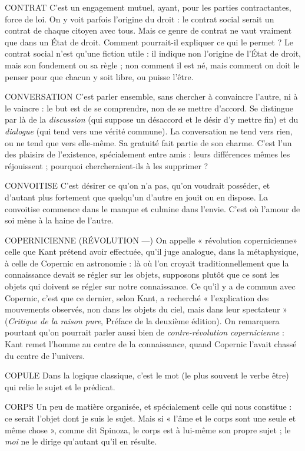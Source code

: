 CONTRAT C'est un engagement mutuel, ayant, pour les parties contractantes,
force de loi. On y voit parfois l’origine du droit : le
contrat social serait un contrat de chaque citoyen avec tous. Mais ce genre de
contrat ne vaut vraiment que dans un État de droit. Comment pourrait-il
expliquer ce qui le permet ?
Le contrat social n’est qu’une fiction utile : il indique non l’origine de
l’État de droit, mais son fondement ou sa règle ; non comment il est né, mais
comment on doit le penser pour que chacun y soit libre, ou puisse l'être.

CONVERSATION C’est parler ensemble, sans chercher à convaincre l’autre,
ni à le vaincre : le but est de se comprendre, non de se
mettre d’accord. Se distingue par là de la {\it discussion} (qui suppose un désaccord et le
désir d’y mettre fin) et du {\it dialogue} (qui tend vers une vérité commune). La conversation
ne tend vers rien, ou ne tend que vers elle-même. Sa gratuité fait partie de
son charme. C’est l’un des plaisirs de l'existence, spécialement entre amis : leurs différences
mêmes les réjouissent ; pourquoi chercheraient-ils à les supprimer ?

CONVOITISE C’est désirer ce qu’on n’a pas, qu’on voudrait posséder, et
d’autant plus fortement que quelqu'un d’autre en jouit ou
en dispose. La convoitise commence dans le manque et culmine dans l'envie.
C’est où l’amour de soi mène à la haine de l’autre.

COPERNICIENNE (RÉVOLUTION —) On appelle « révolution copernicienne» celle que Kant prétend
avoir effectuée, qu’il juge analogue, dans la métaphysique, à celle de Copernic
en astronomie : là où l’on croyait traditionnellement que la connaissance devait
se régler sur les objets, supposons plutôt que ce sont les objets qui doivent se
régler sur notre connaissance. Ce qu’il y a de commun avec Copernic, c’est que
ce dernier, selon Kant, a recherché « l'explication des mouvements observés,
non dans les objets du ciel, mais dans leur spectateur » ({\it Critique de la raison
pure}, Préface de la deuxième édition). On remarquera pourtant qu’on pourrait
parler aussi bien de {\it contre-révolution copernicienne} : Kant remet l’homme au
centre de la connaissance, quand Copernic l’avait chassé du centre de l’univers.

COPULE Dans la logique classique, c’est le mot (le plus souvent le verbe
être) qui relie le sujet et le prédicat.

CORPS Un peu de matière organisée, et spécialement celle qui nous
constitue : ce serait l’objet dont je suis le sujet. Mais si « l’âme et le
corps sont une seule et même chose », comme dit Spinoza, le corps est à lui-même
son propre sujet ; le {\it moi} ne le dirige qu’autant qu’il en résulte.

